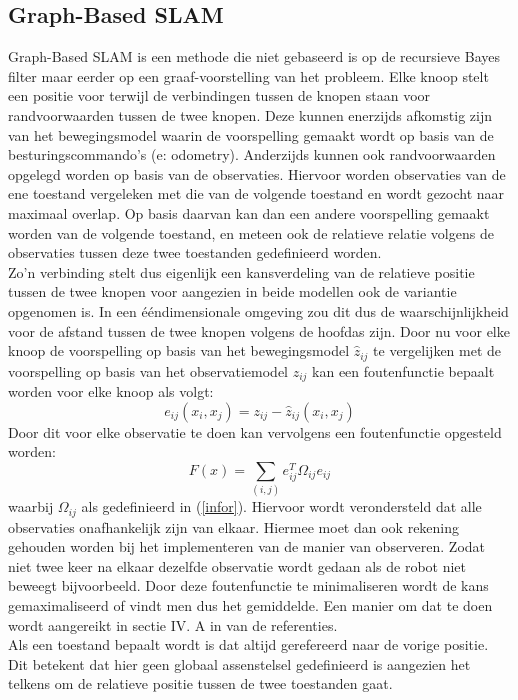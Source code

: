 \documentclass{book}
\begin{document}
\subsection{Graph-Based SLAM}
Graph-Based SLAM is een methode die niet gebaseerd is op de recursieve Bayes filter maar eerder op een graaf-voorstelling van het probleem. Elke knoop stelt een positie voor terwijl de verbindingen tussen de knopen staan voor randvoorwaarden tussen de twee knopen. Deze kunnen enerzijds afkomstig zijn van het bewegingsmodel waarin de voorspelling gemaakt wordt op basis van de besturingscommando's (e: odometry). Anderzijds kunnen ook randvoorwaarden opgelegd worden op basis van de observaties. Hiervoor worden observaties van de ene toestand vergeleken met die van de volgende toestand en wordt gezocht naar maximaal overlap. Op basis daarvan kan dan een andere voorspelling gemaakt worden van de volgende toestand, en meteen ook de relatieve relatie volgens de observaties tussen deze twee toestanden gedefinieerd worden.\\
Zo'n verbinding stelt dus eigenlijk een kansverdeling van de relatieve positie tussen de twee knopen voor aangezien in beide modellen ook de variantie opgenomen is. In een ééndimensionale omgeving zou dit dus de waarschijnlijkheid voor de afstand tussen de twee knopen volgens de hoofdas zijn. 
Door nu voor elke knoop de voorspelling op basis van het bewegingsmodel $\hat{z}_{ij}$ te vergelijken met de voorspelling op basis van het observatiemodel $z_{ij}$ kan een foutenfunctie bepaalt worden voor elke knoop als volgt:
\begin{equation}
e_{ij}(x_i,x_j) = z_{ij} - \hat{z}_{ij}(x_i,x_j)
\end{equation}
Door dit voor elke observatie te doen kan vervolgens een foutenfunctie opgesteld worden:
\begin{equation}
F(x) = \sum\limits_{(i,j)} e_{ij}^T \Omega_{ij} e_{ij}
\end{equation}
waarbij $\Omega_{ij}$ als gedefinieerd in (\ref{infor}). Hiervoor wordt verondersteld dat alle observaties onafhankelijk zijn van elkaar. Hiermee moet dan ook rekening gehouden worden bij het implementeren van de manier van observeren. Zodat niet twee keer na elkaar dezelfde observatie wordt gedaan als de robot niet beweegt bijvoorbeeld. Door deze foutenfunctie te minimaliseren wordt de kans gemaximaliseerd of vindt men dus het gemiddelde. Een manier om dat te doen wordt aangereikt in sectie IV. A in \cite{graph} van de referenties.\\
Als een toestand bepaalt wordt is dat altijd gerefereerd naar de vorige positie. Dit betekent dat hier geen globaal assenstelsel gedefinieerd is aangezien het telkens om de relatieve positie tussen de twee toestanden gaat. \\
\end{document}
